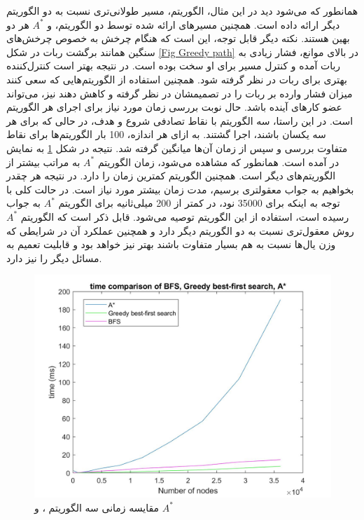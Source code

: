\newpage
همانطور که می‌شود دید در این مثال، الگوریتم،  مسیر طولانی‌تری نسبت به دو الگوریتم دیگر ارائه داده است. همچنین مسیرهای ارائه شده توسط دو الگوریتم،  و $A^*$ هر دو بهین هستند.
\newpage
نکته دیگر قابل توجه، این است که هنگام چرخش به خصوص چرخش‌های سنگین همانند برگشت ربات در شکل \ref{Fig Greedy path} در بالای موانع، فشار زیادی به ربات آمده و کنترل مسیر برای او سخت بوده است. در نتیجه بهتر است کنترل‌کننده بهتری برای ربات در نظر گرفته شود. همچنین استفاده از الگوریتم‌هایی که سعی کنند میزان فشار وارده بر ربات را در تصمیمشان در نظر گرفته و کاهش دهند نیز، می‌تواند عضو کارهای آینده باشد.
\newpage
حال نوبت بررسی زمان مورد نیاز برای اجرای هر الگوریتم است. در این راستا، سه الگوریتم با نقاط تصادفی شروع و هدف، در حالی که برای هر سه یکسان باشند، اجرا گشتند. به ازای هر اندازه، 100 بار الگوریتم‌ها برای نقاط متفاوت بررسی و سپس از زمان آن‌ها میانگین گرفته شد. نتیجه در شکل \ref{Fig heuristic time} به نمایش در آمده است. همانطور که مشاهده می‌شود، زمان الگوریتم $A^*$ به مراتب بیشتر از الگوریتم‌های دیگر است. همچنین الگوریتم  کمترین زمان را دارد. در نتیجه هر چقدر بخواهیم به جواب معقولتری برسیم، مدت زمان بیشتر مورد نیاز است. در حالت کلی با توجه به اینکه برای 35000 نود، در کمتر از 200 میلی‌ثانیه برای الگوریتم $A^*$ به جواب رسیده است، استفاده از این الگوریتم توصیه می‌شود. قابل ذکر است که الگوریتم $A^*$ روش معقول‌تری نسبت به دو الگوریتم دیگر دارد و همچنین عملکرد آن در شرایطی که وزن‌ یال‌ها نسبت به هم بسیار متفاوت باشند بهتر نیز خواهد بود و قابلیت تعمیم به مسائل دیگر را نیز دارد.

\begin{figure}[!h]
	\centering
	\includegraphics[scale=0.35]{Images/Heuristic time.jpg}
	\caption{مقایسه زمانی سه الگوریتم ،  و $A^*$}\label{Fig heuristic time}
\end{figure}


